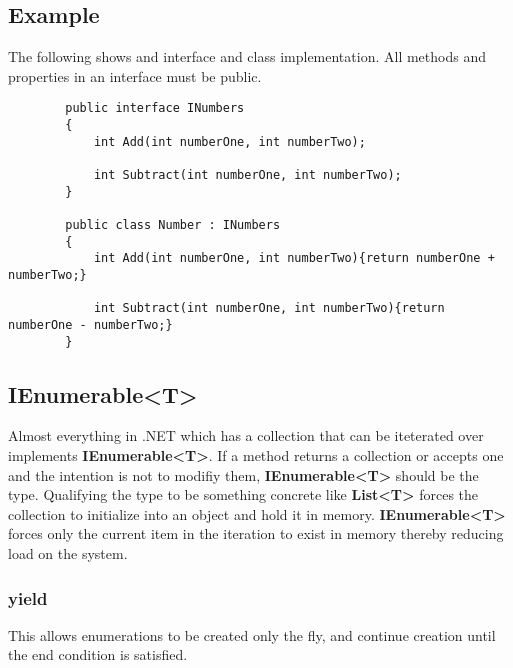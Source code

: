 \documentclass {amsart}
\begin{document}
	\subsection{Example}  The following shows and interface and class implementation.  All methods and properties in an interface must be public. 

	\begin{lstlisting}
		public interface INumbers
		{
			int Add(int numberOne, int numberTwo);

			int Subtract(int numberOne, int numberTwo);
		}

		public class Number : INumbers
		{
			int Add(int numberOne, int numberTwo){return numberOne + numberTwo;}

			int Subtract(int numberOne, int numberTwo){return numberOne - numberTwo;}
		}

	\end{lstlisting}


	\subsection{IEnumerable\textless T\textgreater}  Almost everything in .NET which has a collection that can be iteterated over implements {\bf IEnumerable\textless T\textgreater}.  If a method returns a collection or accepts one and the intention is not to modifiy them, {\bf IEnumerable\textless T\textgreater} should be the type.  Qualifying the type to be something concrete like {\bf List\textless T\textgreater} forces the collection to initialize into an object and hold it in memory.  {\bf IEnumerable\textless T\textgreater} forces only the current item in the iteration to exist in memory thereby reducing load on the system.  



		\subsubsection {yield}  This allows enumerations to be created only the fly, and continue creation until the end condition is satisfied.
\end{document}
